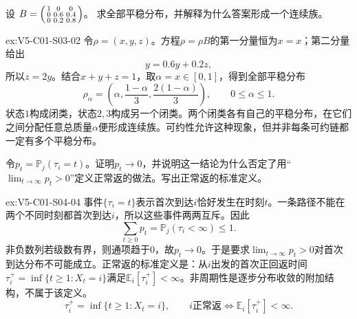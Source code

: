 \begin{SLChapterExercisePairSection}
\begin{exercise}\label{ex:V5-C01-S03-02}
设
$B=\begin{psmallmatrix}1&0&0\\0&0.6&0.4\\0&0.2&0.8\end{psmallmatrix}$。
求全部平稳分布，并解释为什么答案形成一个连续族。
\end{exercise}
\ifSLFullEdition
{}\label{sol:V5-C01-S03-02}
\begin{chapterexercisesolution}{ex:V5-C01-S03-02}
令$\rho=(x,y,z)$。方程$\rho=\rho B$的第一分量恒为$x=x$；第二分量给出
\[
y=0.6y+0.2z,
\]
所以$z=2y$。结合$x+y+z=1$，取$\alpha=x\in[0,1]$，得到全部平稳分布
\[
\rho_\alpha=\left(\alpha,\frac{1-\alpha}{3},
\frac{2(1-\alpha)}{3}\right),\qquad0\le\alpha\le1.
\]
状态$1$构成闭类，状态$2,3$构成另一个闭类。两个闭类各有自己的平稳分布，在它们之间分配任意总质量$\alpha$便形成连续族。可约性允许这种现象，但并非每条可约链都一定有多个平稳分布。
\end{chapterexercisesolution}
\fi

\begin{exercise}\label{ex:V5-C01-S04-04}
令$p_t=\mathbb P_j(\tau_i=t)$。证明$p_t\to0$，并说明这一结论为什么否定了用“$\lim_{t\to\infty}p_t>0$”定义正常返的做法。写出正常返的标准定义。
\end{exercise}
\ifSLFullEdition
{}\label{sol:V5-C01-S04-04}
\begin{chapterexercisesolution}{ex:V5-C01-S04-04}
事件$\{\tau_i=t\}$表示首次到达$i$恰好发生在时刻$t$。一条路径不能在两个不同时刻都首次到达$i$，所以这些事件两两互斥。因此
\[
\sum_{t\ge0}p_t
=\mathbb P_j(\tau_i<\infty)\le1.
\]
非负数列若级数有界，则通项趋于$0$，故$p_t\to0$。于是要求$\lim_{t\to\infty}p_t>0$对首次到达分布不可能成立。正常返的标准定义是：从$i$出发的首次正回返时间$\tau_i^+=\inf\{t\ge1:X_t=i\}$满足$\mathbb E_i[\tau_i^+]<\infty$。非周期性是逐步分布收敛的附加结构，不属于该定义。
\[
\tau_i^+=\inf\{t\ge1:X_t=i\},\qquad
i\text{正常返}\Longleftrightarrow \mathbb E_i[\tau_i^+]<\infty.
\]
\end{chapterexercisesolution}
\fi


\end{SLChapterExercisePairSection}
